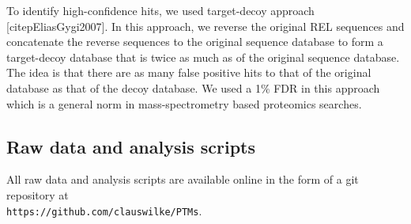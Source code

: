 \documentclass[12pt]{article}
\begin{document}
To identify high-confidence hits, we used target-decoy approach [citep{EliasGygi2007}]. In this approach, we reverse the original REL sequences and concatenate the reverse sequences to the original sequence database to form a target-decoy database that is twice as much as of the original sequence database. The idea is that there are as many false positive hits to that of the original database as that of the decoy database. We used a 1\% FDR in this approach which is a general norm in mass-spectrometry based proteomics searches.







\subsection{Raw data and analysis scripts}

All raw data and analysis scripts are available online in the form of a git repository at\\ \texttt{https://github.com/clauswilke/PTMs}.
\end{document}
